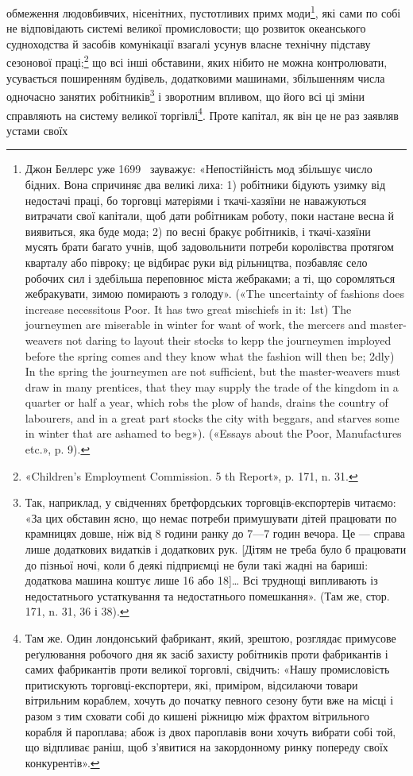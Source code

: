 обмеження людовбивчих, нісенітних, пустотливих примх моди\footnote{
Джон Беллерс уже 1699~ зауважує: «Непостійність мод збільшує
число бідних. Вона спричиняє два великі лиха: 1) робітники бідують
узимку від недостачі праці, бо торговці матеріями і ткачі-хазяїни не
наважуються витрачати свої капітали, щоб дати робітникам роботу, поки
настане весна й виявиться, яка буде мода; 2) по весні бракує робітників,
і ткачі-хазяїни мусять брати багато учнів, щоб задовольнити потреби
королівства протягом кварталу або півроку; це відбирає руки від рільництва, позбавляє село робочих
сил і здебільша переповнює міста жебраками; а ті, що соромляться жебракувати, зимою помирають з
голоду».
(«The uncertainty of fashions does increase necessitous Poor. It has two
great mischiefs in it: 1st) The journeymen are miserable in winter for want
of work, the mercers and master-weavers not daring to layout their stocks
to kepp the journeymen imployed before the spring comes and they know
what the fashion will then be; 2dly) In the spring the journeymen are
not sufficient, but the master-weavers must draw in many prentices, that
they may supply the trade of the kingdom in a quarter or half a year, which
robs the plow of hands, drains the country of labourers, and in a great part
stocks the city with beggars, and starves some in winter that are ashamed
to beg»). («Essays about the Poor, Manufactures etc.», p. 9).
},
які сами по собі не відповідають системі великої промисловости;
що розвиток океанського судноходства й засобів комунікації
взагалі усунув власне технічну підставу сезонової праці;\footnote{
«Children’s Employment Commission. 5 th Report», p. 171, n. 31.
}
що всі інші обставини, яких нібито не можна контролювати,
усувається поширенням будівель, додатковими машинами, збільшенням числа одночасно занятих робітників\footnote{
Так, наприклад, у свідченнях бретфордських торговців-експортерів читаємо: «За цих обставин
ясно, що немає потреби примушувати
дітей працювати по крамницях довше, ніж від 8 години ранку до 7—7 годин вечора. Це — справа лише
додаткових видатків і додаткових рук.
[Дітям не треба було б працювати до пізньої ночі, коли б деякі підприємці не були такі жадні на
бариші: додаткова машина коштує лише
16 або 18]\dots{} Всі труднощі випливають із недостатнього
устаткування та недостатнього помешкання». (Там же, стор. 171, n. 31,
36 і 38).
} і зворотним впливом, що його всі ці зміни справляють на систему великої торгівлі\footnote{
Там же. Один лондонський фабрикант, який, зрештою, розглядає
примусове реґулювання робочого дня як засіб захисту робітників проти
фабрикантів і самих фабрикантів проти великої торговлі, свідчить: «Нашу
промисловість притискують торговці-експортери, які, приміром, відсилаючи товари вітрильним кораблем,
хочуть до початку певного сезону
бути вже на місці і разом з тим сховати собі до кишені ріжницю між
фрахтом вітрильного корабля й пароплава; абож із двох пароплавів вони
хочуть вибрати собі той, що відпливає раніш, щоб з’явитися на закордонному ринку попереду своїх
конкурентів».
}.  Проте
капітал, як він це не раз заявляв устами своїх
\parbreak{}  %
